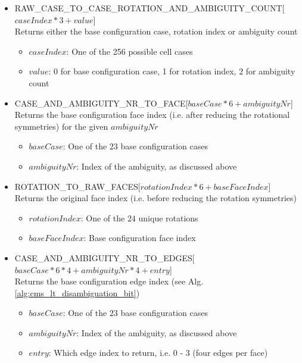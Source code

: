 \begin{itemize}

	\item RAW\_CASE\_TO\_CASE\_ROTATION\_AND\_AMBIGUITY\_COUNT[$caseIndex * 3 + value$]\\
	Returns either the base configuration case, rotation index or ambiguity count
	\begin{itemize}
		\item $caseIndex$: One of the 256 possible cell cases
		\item $value$: 0 for base configuration case, 1 for rotation index, 2 for ambiguity count
  \end{itemize}
	
	\item CASE\_AND\_AMBIGUITY\_NR\_TO\_FACE[$baseCase * 6 + ambiguityNr$]\\
	Returns the base configuration face index (i.e. after reducing the rotational symmetries) for the given $ambiguityNr$
	\begin{itemize}
		\item $baseCase$: One of the $23$ base configuration cases
		\item $ambiguityNr$: Index of the ambiguity, as discussed above
  \end{itemize}
	
	\item ROTATION\_TO\_RAW\_FACES[$rotationIndex * 6 + baseFaceIndex$]\\
	Returns the original face index (i.e. before reducing the rotation symmetries)
	\begin{itemize}
		\item $rotationIndex$: One of the $24$ unique rotations
		\item $baseFaceIndex$: Base configuration face index
  \end{itemize}
		
	\item CASE\_AND\_AMBIGUITY\_NR\_TO\_EDGES[$baseCase * 6 * 4 + ambiguityNr * 4 + entry$]\\
	Returns the base configuration edge index (see Alg. \ref{alg:cms_lt_disambiguation_bit})
	\begin{itemize}
		\item $baseCase$: One of the $23$ base configuration cases
		\item $ambiguityNr$: Index of the ambiguity, as discussed above
		\item $entry$: Which edge index to return, i.e. 0 - 3 (four edges per face)
  \end{itemize}
	

\end{itemize}
